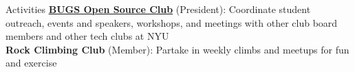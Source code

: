 \documentclass{resume} %
\begin{document}
\begin{rSection}{Activities}
\textbf{\href{https://bugs-nyu.github.io/}{BUGS Open Source Club}} (President): Coordinate student outreach, events and speakers, workshops, and meetings with other club board members and other tech clubs at NYU\\
\textbf{Rock Climbing Club} (Member): Partake in weekly climbs and meetups for fun and exercise

\end{rSection}
\end{document}
